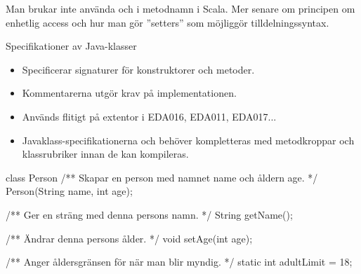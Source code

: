 \ifkompendium
Man brukar inte använda  och  i metodnamn i Scala. Mer senare om principen om enhetlig access  och hur man gör ''setters'' som möjliggör tilldelningssyntax.
\fi


\begin{Slide}{Specifikationer av Java-klasser}
\begin{itemize}\small
\item Specificerar signaturer för konstruktorer och metoder. 
\item Kommentarerna utgör krav på implementationen.  
\item Används flitigt på extentor i EDA016, EDA011, EDA017...
\item Javaklass-specifikationerna   och behöver kompletteras med metodkroppar och klassrubriker innan de kan kompileras.
\end{itemize}
\begin{JavaSpec}{class Person}
/** Skapar en person med namnet name och åldern age. */
Person(String name, int age);

/** Ger en sträng med denna persons namn. */
String getName();

/** Ändrar denna persons ålder. */
void setAge(int age);

/** Anger åldersgränsen för när man blir myndig. */
static int adultLimit = 18;
\end{JavaSpec}
\end{Slide}

